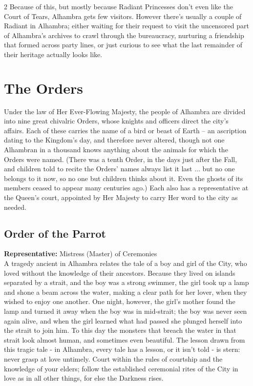 \begin{multicols}{2}
Because of this, but mostly because Radiant Princesses don't even like the Court of Tears, Alhambra gets few visitors. However there's usually a couple of Radiant in Alhambra; either waiting for their request to visit the uncensored part of Alhambra's archives to crawl through the bureaucracy, nurturing a friendship that formed across party lines, or just curious to see what the last remainder of their heritage actually looks like.

\section*{The Orders}

Under the law of Her Ever-Flowing Majesty, the people of Alhambra are divided into nine great chivalric Orders, whose knights and officers direct the city's affairs. Each of these carries the name of a bird or beast of Earth -- an ascription dating to the Kingdom's day, and therefore never altered, though not one Alhambran in a thousand knows anything about the animals for which the Orders were named. (There was a tenth Order, in the days just after the Fall, and children told to recite the Orders' names always list it last ... but no one belongs to it now, so no one but children thinks about it. Even the ghosts of its members ceased to appear many centuries ago.) Each also has a representative at the Queen's court, appointed by Her Majesty to carry Her word to the city as needed. 

\subsection*{Order of the Parrot}

\textbf{Representative:} Mistress (Master) of Ceremonies\\

\noindent A tragedy ancient in Alhambra relates the tale of a boy and girl of the City, who loved without the knowledge of their ancestors. Because they lived on islands separated by a strait, and the boy was a strong swimmer, the girl took up a lamp and shone a beam across the water, making a clear path for her lover, when they wished to enjoy one another. One night, however, the girl's mother found the lamp and turned it away when the boy was in mid-strait; the boy was never seen again alive, and when the girl learned what had passed she plunged herself into the strait to join him. To this day the monsters that breach the water in that strait look almost human, and sometimes even beautiful. The lesson drawn from this tragic tale - in Alhambra, every tale has a lesson, or it isn't told - is stern: never grasp at love untimely. Court within the rules of courtship and the knowledge of your elders; follow the established ceremonial rites of the City in love as in all other things, for else the Darkness rises.


\end{multicols}

